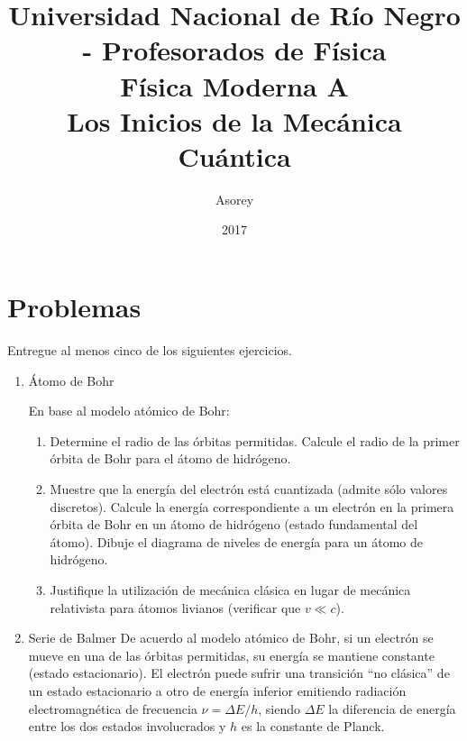\documentclass[a4paper,12pt]{article}
\begin{document}
\title{
{\normalsize{Universidad Nacional de Río Negro - Profesorados de Física}}\\
Física Moderna A \\ Los Inicios de la Mecánica Cuántica\\}
\author{Asorey}
\date{2017}
\maketitle

\section{Problemas}

Entregue al menos cinco de los siguientes ejercicios. 

\begin{enumerate}
\setcounter{enumi}{0}      %

\item {Átomo de Bohr}

En base al modelo atómico de Bohr:

\begin{enumerate}
\item Determine el radio de las órbitas permitidas. Calcule el radio de la
primer órbita de Bohr para el átomo de
hidrógeno.
\item Muestre que la energía del electrón está cuantizada (admite sólo valores
discretos). Calcule la energía correspondiente a un electrón en la primera
órbita de Bohr en un átomo de hidrógeno (estado fundamental del átomo). Dibuje
el diagrama de niveles de energía para un átomo de hidrógeno.
\item Justifique la utilización de mecánica clásica en lugar de mecánica
relativista para átomos livianos (verificar que $v \ll c$).
\end{enumerate}

\item {Serie de Balmer}
De acuerdo al modelo atómico de Bohr, si un electrón se mueve en una de las
órbitas permitidas, su energía se mantiene constante (estado estacionario). El
electrón puede sufrir una transición ``no clásica'' de un estado estacionario a
otro de energía inferior emitiendo radiación electromagnética de frecuencia
$\nu = \Delta E/h$, siendo $\Delta E$ la diferencia de energía entre los dos
estados involucrados y $h$ es la constante de Planck.


\end{enumerate}
\end{document}
